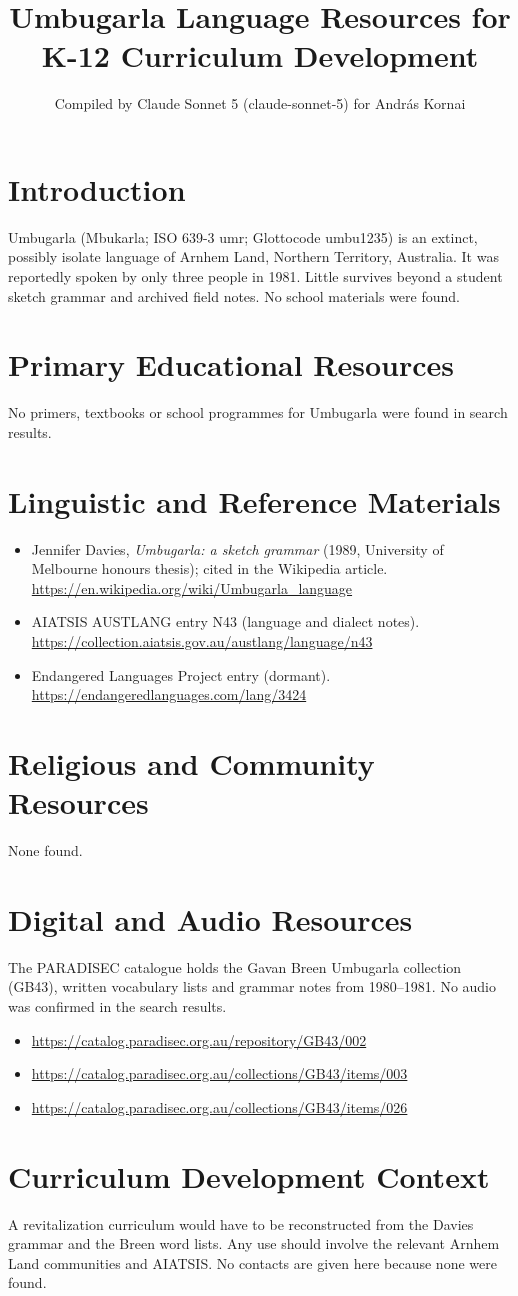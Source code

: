 \documentclass[12pt]{article}
\title{Umbugarla Language Resources for K-12 Curriculum Development}
\author{Compiled by Claude Sonnet 5 (claude-sonnet-5) for Andr\'as Kornai}
\date{}
\begin{document}
\maketitle
\section{Introduction}
Umbugarla (Mbukarla; ISO 639-3 umr; Glottocode umbu1235) is an extinct, possibly isolate language of Arnhem Land, Northern Territory, Australia. It was reportedly spoken by only three people in 1981. Little survives beyond a student sketch grammar and archived field notes. No school materials were found.
\section{Primary Educational Resources}
No primers, textbooks or school programmes for Umbugarla were found in search results.
\section{Linguistic and Reference Materials}
\begin{itemize}
\item Jennifer Davies, \emph{Umbugarla: a sketch grammar} (1989, University of Melbourne honours thesis); cited in the Wikipedia article. \url{https://en.wikipedia.org/wiki/Umbugarla_language}
\item AIATSIS AUSTLANG entry N43 (language and dialect notes). \url{https://collection.aiatsis.gov.au/austlang/language/n43}
\item Endangered Languages Project entry (dormant). \url{https://endangeredlanguages.com/lang/3424}
\end{itemize}
\section{Religious and Community Resources}
None found.
\section{Digital and Audio Resources}
The PARADISEC catalogue holds the Gavan Breen Umbugarla collection (GB43), written vocabulary lists and grammar notes from 1980--1981. No audio was confirmed in the search results.
\begin{itemize}
\item \url{https://catalog.paradisec.org.au/repository/GB43/002}
\item \url{https://catalog.paradisec.org.au/collections/GB43/items/003}
\item \url{https://catalog.paradisec.org.au/collections/GB43/items/026}
\end{itemize}
\section{Curriculum Development Context}
A revitalization curriculum would have to be reconstructed from the Davies grammar and the Breen word lists. Any use should involve the relevant Arnhem Land communities and AIATSIS. No contacts are given here because none were found.
\end{document}
